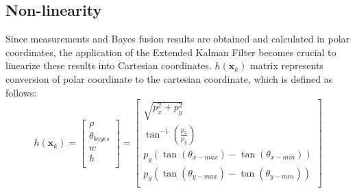 \newpage
\subsection{Non-linearity}\label{equ:2_non_linear}
Since measurements and Bayes fusion results are obtained and calculated in polar coordinates, 
the application of the Extended Kalman Filter becomes crucial to linearize these results into Cartesian coordinates. 
$h(\mathbf{x}_k)$ matrix represents conversion of polar coordinate to the cartesian coordinate, which is defined as follows:
\begin{equation}
    h(\mathbf{x}_k)=
    \begin{bmatrix}
        \rho \\ 
        \theta_{bayes}\\
        w\\
        h\\
    \end{bmatrix}=
    \begin{bmatrix}
    \sqrt{p_x^2+p_y^2}\\
    \tan^{-1}(\frac{p_x}{p_y})\\
    p_y (\tan(\theta_{x-max}) - \tan(\theta_{x-min}))\\
    p_y (\tan(\theta_{y-max}) - \tan(\theta_{y-min}))\\
    \end{bmatrix}
\end{equation}

